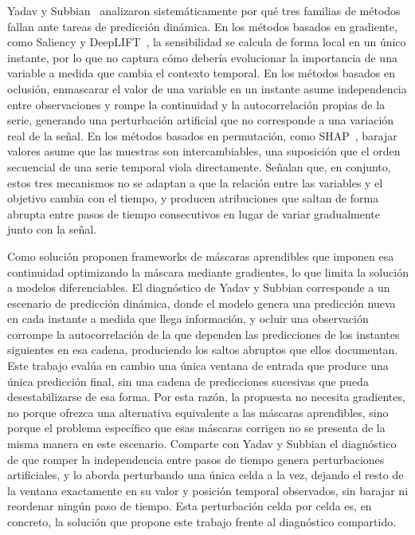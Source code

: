 \documentclass[conference, letterpaper]{IEEEtran}
\begin{document}
Yadav y Subbian~\cite{yadav2025} analizaron sistemáticamente por qué tres familias de métodos fallan ante tareas de predicción dinámica. En los métodos basados en gradiente, como Saliency y DeepLIFT~\cite{shrikumar2017}, la sensibilidad se calcula de forma local en un único instante, por lo que no captura cómo debería evolucionar la importancia de una variable a medida que cambia el contexto temporal. En los métodos basados en oclusión, enmascarar el valor de una variable en un instante asume independencia entre observaciones y rompe la continuidad y la autocorrelación propias de la serie, generando una perturbación artificial que no corresponde a una variación real de la señal. En los métodos basados en permutación, como SHAP~\cite{lundberg2017}, barajar valores asume que las muestras son intercambiables, una suposición que el orden secuencial de una serie temporal viola directamente. Señalan que, en conjunto, estos tres mecanismos no se adaptan a que la relación entre las variables y el objetivo cambia con el tiempo, y producen atribuciones que saltan de forma abrupta entre pasos de tiempo consecutivos en lugar de variar gradualmente junto con la señal.

Como solución proponen frameworks de máscaras aprendibles que imponen esa continuidad optimizando la máscara mediante gradientes, lo que limita la solución a modelos diferenciables. El diagnóstico de Yadav y Subbian corresponde a un escenario de predicción dinámica, donde el modelo genera una predicción nueva en cada instante a medida que llega información, y ocluir una observación corrompe la autocorrelación de la que dependen las predicciones de los instantes siguientes en esa cadena, produciendo los saltos abruptos que ellos documentan. Este trabajo evalúa en cambio una única ventana de entrada que produce una única predicción final, sin una cadena de predicciones sucesivas que pueda desestabilizarse de esa forma. Por esta razón, la propuesta no necesita gradientes, no porque ofrezca una alternativa equivalente a las máscaras aprendibles, sino porque el problema específico que esas máscaras corrigen no se presenta de la misma manera en este escenario. Comparte con Yadav y Subbian el diagnóstico de que romper la independencia entre pasos de tiempo genera perturbaciones artificiales, y lo aborda perturbando una única celda a la vez, dejando el resto de la ventana exactamente en su valor y posición temporal observados, sin barajar ni reordenar ningún paso de tiempo. Esta perturbación celda por celda es, en concreto, la solución que propone este trabajo frente al diagnóstico compartido.
\end{document}
